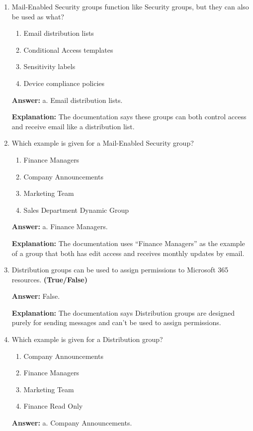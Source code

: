 \documentclass[10pt]{article}
\begin{document}
\begin{enumerate}[leftmargin=*]
\textbf{Explanation:} These are the exact resources listed in the ``Marketing Team'' example.

\item Mail-Enabled Security groups function like Security groups, but they can also be used as what?
\begin{enumerate}[label=\alph*., leftmargin=1.5em]
\item Email distribution lists
\item Conditional Access templates
\item Sensitivity labels
\item Device compliance policies
\end{enumerate}
\textbf{Answer:} a. Email distribution lists.

\textbf{Explanation:} The documentation says these groups can both control access and receive email like a distribution list.

\item Which example is given for a Mail-Enabled Security group?
\begin{enumerate}[label=\alph*., leftmargin=1.5em]
\item Finance Managers
\item Company Announcements
\item Marketing Team
\item Sales Department Dynamic Group
\end{enumerate}
\textbf{Answer:} a. Finance Managers.

\textbf{Explanation:} The documentation uses ``Finance Managers'' as the example of a group that both has edit access and receives monthly updates by email.

\item Distribution groups can be used to assign permissions to Microsoft 365 resources. \textbf{(True/False)}

\textbf{Answer:} False.

\textbf{Explanation:} The documentation says Distribution groups are designed purely for sending messages and can’t be used to assign permissions.

\item Which example is given for a Distribution group?
\begin{enumerate}[label=\alph*., leftmargin=1.5em]
\item Company Announcements
\item Finance Managers
\item Marketing Team
\item Finance Read Only
\end{enumerate}
\textbf{Answer:} a. Company Announcements.


\end{enumerate}
\end{document}
